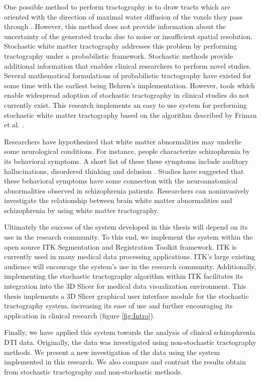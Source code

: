 One possible method to perform tractography is to draw tracts which are oriented with the direction of maximal water diffusion of the voxels they pass through \cite{frimanTMI06}.  However, this method does not provide information about the uncertainty of the generated tracks due to noise or insufficient spatial resolution.  Stochastic white matter tractography addresses this problem by performing tractography under a probabilistic framework.  Stochastic methods provide additional information that enables clinical researchers to perform novel studies.  Several mathematical formulations of probabilistic tractography have existed for some time with the earliest being Behren's implementation\cite{behrensMRM03}.  However, tools which enable widespread adoption of stochastic tractography in clinical studies do not currently exist.  This research implements an easy to use system for performing stochastic white matter tractography based on the algorithm described by Friman et al. \cite{frimanTMI06}.

Researchers have hypothesized that white matter abnormalities may underlie some neurological conditions.  For instance, people characterize schizophrenia by its behavioral symptoms.  A short list of these these symptoms include auditory hallucinations, disordered thinking and delusion \cite{kubickiNYAS05}.  Studies have suggested that these behavioral symptoms have some connection with the neuroanatomical abnormalities observed in schizophrenia patients\cite{kubickiNYAS05}.  Researchers can noninvasively investigate the relationship between brain white matter abnormalities and schizophrenia by using white matter tractography.

Ultimately the success of the system developed in this thesis will depend on its use in the research community.  To this end, we implement the system within the open source ITK Segmentation and Registration Toolkit \cite{itk} framework.  ITK is currently used in many medical data processing applications.  ITK's large existing audience will encourage the system's use in the research community.  Additionally, implementing the stochastic tractography algorithm within ITK facilitates its integration into the 3D Slicer \cite{3Dslicer} for medical data visualization environment.  This thesis implements a 3D Slicer graphical user interface module for the stochastic tractography system, increasing its ease of use and further encouraging its application in clinical research (figure \ref{fig:Intro}).

Finally, we have applied this system towards the analysis of clinical schizophrenia DTI data.  Originally, the data was investigated using non-stochastic tractography methods.  We present a new investigation of the data using the system implemented in this research.  We also compare and contrast the results obtain from stochastic tractography and non-stochastic methods.

